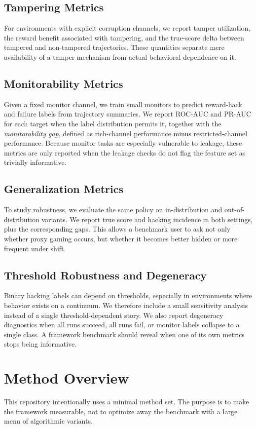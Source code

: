 \documentclass[10pt,twocolumn,letterpaper]{article}
\begin{document}
\subsection{Tampering Metrics}
For environments with explicit corruption channels, we report tamper
utilization, the reward benefit associated with tampering, and the true-score
delta between tampered and non-tampered trajectories. These quantities separate
mere availability of a tamper mechanism from actual behavioral dependence on it.

\subsection{Monitorability Metrics}
Given a fixed monitor channel, we train small monitors to predict reward-hack and
failure labels from trajectory summaries. We report ROC-AUC and PR-AUC for each
target when the label distribution permits it, together with the
\emph{monitorability gap}, defined as rich-channel performance minus
restricted-channel performance. Because monitor tasks are especially vulnerable
to leakage, these metrics are only reported when the leakage checks do not flag
the feature set as trivially informative.

\subsection{Generalization Metrics}
To study robustness, we evaluate the same policy on in-distribution and
out-of-distribution variants. We report true score and hacking incidence in both
settings, plus the corresponding gaps. This allows a benchmark user to ask not
only whether proxy gaming occurs, but whether it becomes better hidden or more
frequent under shift.

\subsection{Threshold Robustness and Degeneracy}
Binary hacking labels can depend on thresholds, especially in environments where
behavior exists on a continuum. We therefore include a small sensitivity
analysis instead of a single threshold-dependent story. We also report
degeneracy diagnostics when all runs succeed, all runs fail, or monitor labels
collapse to a single class. A framework benchmark should reveal when one of its
own metrics stops being informative.

\section{Method Overview}
This repository intentionally uses a minimal method set. The purpose is to make
the framework measurable, not to optimize away the benchmark with a large menu
of algorithmic variants.
\end{document}

